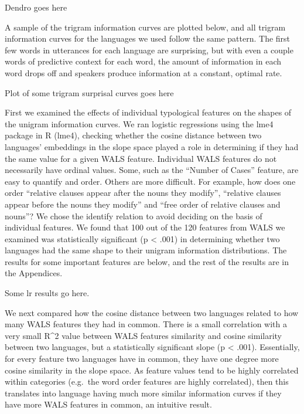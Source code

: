 \documentclass[11pt,]{article}
\newenvironment{Shaded}{\begin{snugshade}}{\end{snugshade}}
\newcommand{\DataTypeTok}[1]{\textcolor[rgb]{0.13,0.29,0.53}{#1}}
\newcommand{\FloatTok}[1]{\textcolor[rgb]{0.00,0.00,0.81}{#1}}
\newcommand{\KeywordTok}[1]{\textcolor[rgb]{0.13,0.29,0.53}{\textbf{#1}}}
\newcommand{\NormalTok}[1]{#1}
\newcommand{\OperatorTok}[1]{\textcolor[rgb]{0.81,0.36,0.00}{\textbf{#1}}}
\newcommand{\StringTok}[1]{\textcolor[rgb]{0.31,0.60,0.02}{#1}}
\begin{document}
Dendro goes here

A sample of the trigram information curves are plotted below, and all trigram information curves for the languages we used follow the same pattern. The first few words in utterances for each language are surprising, but with even a couple words of predictive context for each word, the amount of information in each word drops off and speakers produce information at a constant, optimal rate.

Plot of some trigram surprisal curves goes here

First we examined the effects of individual typological features on the shapes of the unigram information curves. We ran logistic regressions using the lme4 package in R (lme4), checking whether the cosine distance between two languages' embeddings in the slope space played a role in determining if they had the same value for a given WALS feature. Individual WALS features do not necessarily have ordinal values. Some, such as the ``Number of Cases'' feature, are easy to quantify and order. Others are more difficult. For example, how does one order ``relative clauses appear after the nouns they modify'', ``relative clauses appear before the nouns they modify'' and ``free order of relative clauses and nouns''? We chose the identify relation to avoid deciding on the basis of individual features. We found that 100 out of the 120 features from WALS we examined was statistically significant (p \textless{} .001) in determining whether two languages had the same shape to their unigram information distributions. The results for some important features are below, and the rest of the results are in the Appendices.

Some lr results go here.

We next compared how the cosine distance between two languages related to how many WALS features they had in common. There is a small correlation with a very small R\^{}2 value between WALS features similarity and cosine similarity between two languages, but a statistically significant slope (p \textless{} .001). Essentially, for every feature two languages have in common, they have one degree more cosine similarity in the slope space. As feature values tend to be highly correlated within categories (e.g.~the word order features are highly correlated), then this translates into language having much more similar information curves if they have more WALS features in common, an intuitive result.

\begin{Shaded}
\end{Shaded}
\end{document}
